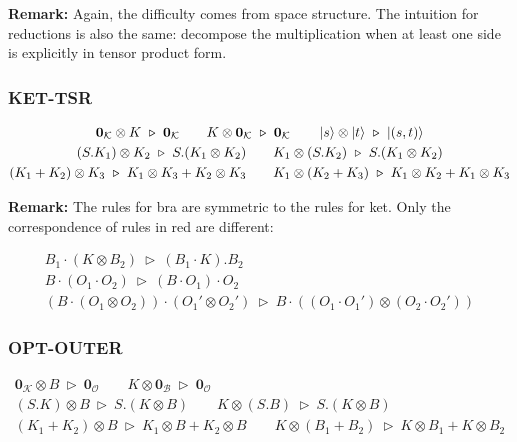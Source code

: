 \documentclass[manuscript, review, timestamp]{acmart}
\newcommand*{\reduce}{\ \triangleright\ }
\begin{document}
\textbf{Remark:} Again, the difficulty comes from space structure. The intuition for reductions is also the same: decompose the multiplication when at least one side is explicitly in tensor product form.


\subsubsection*{\textsf{KET-TSR}}
\begin{gather*}
  \mathbf{0}_\mathcal{K} \otimes K \reduce \mathbf{0}_\mathcal{K}
  \qquad
  K \otimes \mathbf{0}_\mathcal{K} \reduce \mathbf{0}_\mathcal{K}
  \qquad
  \ket{s} \otimes \ket{t}\reduce\ket{(s, t)} \\
  (S.K_1) \otimes K_2 \reduce S.(K_1 \otimes K_2)
  \qquad
  K_1 \otimes (S.K_2) \reduce S.(K_1 \otimes K_2) \\
  (K_1 + K_2) \otimes K_3 \reduce K_1 \otimes K_3 + K_2 \otimes K_3
  \qquad
  K_1 \otimes (K_2 + K_3) \reduce K_1 \otimes K_2 + K_1 \otimes K_3
\end{gather*}

\textbf{Remark: } The rules for bra are symmetric to the rules for ket. Only the correspondence of rules in red are different:

\begin{gather*}
  B_1 \cdot (K \otimes B_2) \reduce (B_1 \cdot K).B_2 \\
  B \cdot (O_1 \cdot O_2) \reduce (B \cdot O_1) \cdot O_2 \\
  (B \cdot (O_1 \otimes O_2)) \cdot (O_1' \otimes O_2') \reduce B \cdot ((O_1 \cdot O_1') \otimes (O_2 \cdot O_2'))
\end{gather*}

\subsubsection*{\textsf{OPT-OUTER}}
\begin{gather*}
  \mathbf{0}_\mathcal{K} \otimes B \reduce \mathbf{0}_\mathcal{O}
  \qquad
  K \otimes \mathbf{0}_\mathcal{B} \reduce \mathbf{0}_\mathcal{O} \\
  (S.K) \otimes B \reduce S.(K \otimes B)
  \qquad
  K \otimes (S.B) \reduce S.(K \otimes B) \\
  (K_1 + K_2) \otimes B \reduce K_1 \otimes B + K_2 \otimes B
  \qquad
  K \otimes (B_1 + B_2) \reduce K \otimes B_1 + K \otimes B_2
\end{gather*}
\end{document}

